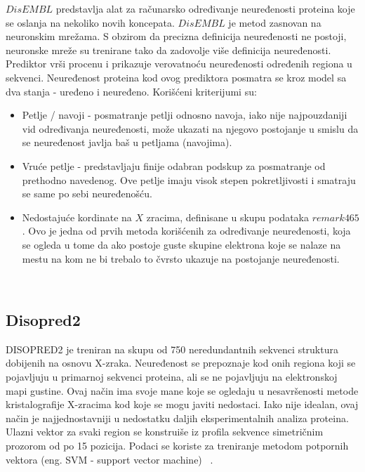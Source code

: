 $DisEMBL$ predstavlja alat za računarsko određivanje neuređenosti proteina koje se oslanja na nekoliko novih koncepata. $DisEMBL$ je metod zasnovan na neuronskim mrežama. S obzirom da precizna definicija neuređenosti ne postoji, neuronske mreže su trenirane tako da zadovolje više definicija neuređenosti. Prediktor vrši procenu i prikazuje verovatnoću neuređenosti određenih regiona u sekvenci. Neuređenost proteina kod ovog prediktora posmatra se kroz model sa dva stanja - uređeno i neuređeno. Korišćeni kriterijumi su:
\begin{itemize}
\item Petlje / navoji  - posmatranje petlji odnosno navoja, iako nije najpouzdaniji vid određivanja neuređenosti, može ukazati na njegovo postojanje u smislu da se neuređenost javlja baš u petljama (navojima).
\item Vruće petlje - predstavljaju finije odabran podskup za posmatranje od prethodno navedenog. Ove petlje imaju visok stepen pokretljivosti i smatraju se same po sebi neuređenošću. 
\item Nedostajuće kordinate na $X$ zracima, definisane u skupu podataka $remark465$. Ovo je jedna od prvih metoda korišćenih za određivanje neuređenosti, koja se ogleda u tome da ako postoje guste skupine elektrona koje se nalaze na mestu na kom ne bi trebalo to čvrsto ukazuje na postojanje neuređenosti.  
\end{itemize}
~\cite{DISEMBL}


\subsection{Disopred2}

DISOPRED2 je treniran na skupu od 750 neredundantnih sekvenci struktura dobijenih na osnovu X-zraka.  Neuređenost se prepoznaje kod onih regiona koji se pojavljuju u primarnoj sekvenci proteina, ali se ne pojavljuju na elektronskoj mapi gustine. Ovaj način ima svoje mane koje se ogledaju u nesavršenosti metode kristalografije X-zracima kod koje se mogu javiti nedostaci. Iako nije idealan, ovaj način je najjednostavniji u nedostatku daljih eksperimentalnih analiza proteina. Ulazni vektor za svaki region se konstruiše iz profila sekvence simetričnim prozorom od po 15 pozicija. Podaci se koriste za treniranje  metodom potpornih vektora (eng. SVM - support vector machine) ~\cite{DISOPRED}.

